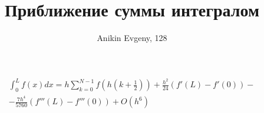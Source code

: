 \documentclass{article}
\title{Приближение суммы интегралом}
\author{Anikin Evgeny, 128}
\begin{document}
\maketitle
\begin{multline}
    \int_0^L f(x) dx = h\sum_{k=0}^{N-1} f(h(k+\frac12))
                       +\frac{h^2}{24} (f'(L) - f'(0)) - \\
                       -\frac{7h^4}{5760}(f'''(L) - f'''(0))
                       + O(h^6)
\end{multline}
\end{document}
